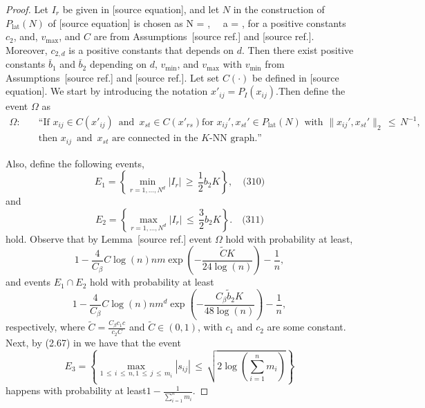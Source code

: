 \documentclass[twoside,11pt]{article}
\makeatletter
\newcommand{\discardlabel}[1]{}
\newcommand{\discardtwo}[2]{}
\newcommand{\legacyref}[1]{\textup{[source ref.]}}
\newcommand{\legacyeqref}[1]{\textup{[source equation]}}
\newenvironment{legacycomparison}{%
  \begingroup\color{legacygray}%
  \let\label\discardlabel
  \let\originallabel\discardlabel
  \let\ref\legacyref
  \let\pageref\legacyref
  \let\eqref\legacyeqref
  \let\cref\legacyref
  \let\Cref\legacyref
  \let\autoref\legacyref
  \let\aliasref\discardtwo
}{\endgroup}
\newcommand{\aliasref}[2]{%
  \@ifundefined{r@#2}{}{%
    \expandafter\let\csname r@#1\expandafter\endcsname\csname r@#2\endcsname}}
\makeatother
\begin{document}
\begin{legacycomparison}
\begin{lemma}

\end{lemma}

\begin{proof}
Let $I_r$ be given in \eqref{I_r}, 
and let $N$ in the construction
of $P_\text{lat}(N)$ of \eqref{lat_g} is chosen as  
\bea  
N = , \quad \,\,\,\,\,\,\quad  a = ,
\bea 
for a positive constants \( c_2 \), and, \( v_{\max} \), and \( C \) are from Assumptions~\ref{asm:m} and \ref{ass_knn}. Moreover, \( c_{2,d} \) is a positive constants that depends on \( d \). Then there exist positive constants \( \bar{b}_1 \) and \( \bar{b}_2 \) depending on \( d \), \( v_{\min} \), and \( v_{\max} \) with \( v_{\min} \) from Assumptions~\ref{asm:m} and \ref{ass_knn}. Let set $C(\cdot)$ be defined in \eqref{knn_center}. We start by introducing the notation ${x'}_{ij} = P_I(x_{ij})$.Then
define the event \(\Omega\)  as
\begin{equation}
\begin{aligned}
\label{def_omega}
\Omega: \quad & \text{``If } x_{ij} \in C(x'_{ij}) \,\,\,\text{and}\,\,\, x_{st} \in C(x'_{rs}) \text{for } x_{ij}', x_{st}' \in P_{\text{lat}}(N) \text{ with } \|x_{ij}', x_{st}'\|_2 \,\leq\, N^{-1}, \\
        & \text{then } x_{ij} \,\,\,\text{and}\,\,\, x_{st} \text{ are connected in the } K\text{-NN graph.''}
\end{aligned}
\end{equation}



Also, define the following events, 
\[
E_1 = \left\{ \min_{r=1,\ldots,N^d} |I_r| \,\geq\, \frac{1}{2} b_2 K \right\}, \quad \text{(310)}
\]
and
\[
E_2 = \left\{ \max_{r=1,\ldots,N^d} |I_r| \,\leq\, \frac{3}{2} b_2 K \right\}. \quad \text{(311)}
\]
hold. Observe that by Lemma~\ref{lemma_14} event $\Omega$ hold with probability at least,
\[
1 - \frac{4}{C_{\beta}}C\log(n)nm\exp\left(-\frac{\tilde C K }{24\log(n)}\right) - \frac{1}{n},
\]
and events $E_1 \cap E_2$ hold with probability at least
\[
1 - \frac{4}{C_{\beta}}C\log(n)nm^d\exp\left(-\frac{C_{\beta} {\tilde b}_2 K}{48\log(n)}\right) - \frac{1}{n},
\]
respectively, where $\tilde C = \frac{C_{\beta}c_1c}{c_2C}$ and $\tilde C \in (0,1)$, with $c_1$ and $c_2$ are some constant.  Next, by (2.67) in \cite{wainwright2019high} we have that the event
\[
E_3 = \left\{ \max_{1 \,\leq\, i \,\leq\, n, 1\,\leq\, j\,\leq\, m_i} |s_{ij}| \,\leq\,   \sqrt{2 \log\left(\sum_{i = 1}^n   m_i\right)} \right\}
\]
happens with probability at least\(1 - \frac{1}{\sum_{i = 1}^n   m_i}\). 



\end{proof}
\end{legacycomparison}
\end{document}
